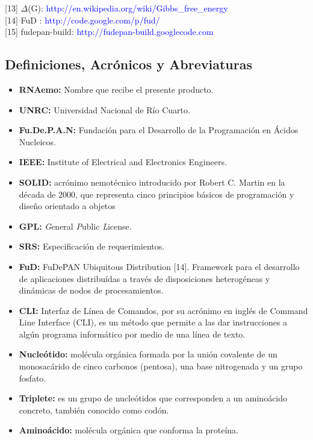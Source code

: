 \documentclass[12pt,a4paper,english,spanish]{article}
\begin{document}
[13] $\Delta$(G): \textcolor{blue}{http://en.wikipedia.org/wiki/Gibbs\_free\_energy} \\

[14] FuD : \textcolor{blue}{http://code.google.com/p/fud/} \\

[15] fudepan-build: \textcolor{blue}{http://fudepan-build.googlecode.com}

\subsection{Definiciones, Acrónicos y Abreviaturas}
\begin{itemize}
	\item \textbf{RNAemo:} Nombre que recibe el presente producto.
	\item \textbf{UNRC:} Universidad Nacional de Río Cuarto.
	\item \textbf{Fu.De.P.A.N:} Fundación para el Desarrollo de la Programación en Ácidos Nucleicos.
	\item \textbf{IEEE:} Institute of Electrical and Electronics Engineers.
	\item \textbf{SOLID:} acrónimo nemotécnico introducido por Robert C. Martin en la
							década de 2000, que representa cinco principios básicos de programación
							y diseño orientado a objetos
	\item \textbf{GPL:} \textit{G}eneral \textit{P}ublic \textit{L}icense.	
	\item \textbf{SRS:} Especificación de requerimientos.
	\item \textbf{FuD:} FuDePAN Ubiquitous Distribution [14]. Framework para el desarrollo de aplicaciones distribuídas a través de disposiciones 							heterogéneas y dinámicas de nodos de procesamientos.
	\item \textbf{CLI:} Interfaz de Línea de Comandos, por su acrónimo en inglés de Command Line Interface (CLI), es un método que permite a las 							dar instrucciones a algún programa informático por medio de una línea de texto.
	\item \textbf{Nucleótido:} molécula orgánica formada por la unión covalente de un monosacárido de cinco carbonos (pentosa), una base nitrogenada y un 								   grupo fosfato.
	\item \textbf{Triplete:} es un grupo de nucleótidos que corresponden a un aminoácido concreto, también conocido como codón.
	\item \textbf{Aminoácido:} molécula orgánica que conforma la proteína.

\end{itemize}
\end{document}
